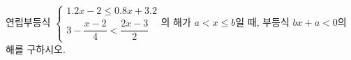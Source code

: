 연립부등식 $\begin{cases} 1.2x-2\le 0.8x+3.2 \\ 3-\dfrac{x-2}{4}<\dfrac{2x-3}{2} \end{cases}$의 해가 $a<x\le b$일 때, 부등식 $bx+a<0$의 해를 구하시오.
